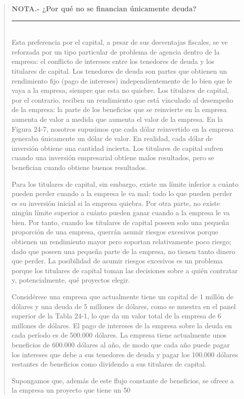 \documentclass[10pt,a4paper]{article}
\newenvironment{specialblock}[1]{%
      \begin{quote} %
      \small %
      \noindent\textbf{#1}\\[-0.3em] %
      \rule{\linewidth}{0.4pt}\\[0.6em]}{
      \end{quote}}
\begin{document}
\begin{specialblock}{\textbf{NOTA.-} ¿Por qué no se financian únicamente deuda?}
    Esta preferencia por el capital, a pesar de sus desventajas fiscales, se ve reforzada por un tipo particular de problema de agencia dentro de la empresa: el conflicto de intereses entre los tenedores de deuda y los titulares de capital. Los tenedores de deuda son partes que obtienen un rendimiento fijo (pago de intereses) independientemente de lo bien que le vaya a la empresa, siempre que esta no quiebre. Los titulares de capital, por el contrario, reciben un rendimiento que está vinculado al desempeño de la empresa: la parte de los beneficios que se reinvierte en la empresa aumenta de valor a medida que aumenta el valor de la empresa. En la Figura 24-7, nosotros  supusimos que cada dólar reinvertido en la empresa generaba únicamente un dólar de valor. En realidad, cada dólar de inversión obtiene una cantidad incierta. Los titulares de capital sufren cuando una inversión empresarial obtiene malos resultados, pero se benefician cuando obtiene buenos resultados.

    Para los titulares de capital, sin embargo, existe un límite inferior a cuánto pueden perder cuando a la empresa le va mal: todo lo que pueden perder es su inversión inicial si la empresa quiebra. Por otra parte, no existe ningún límite superior a cuánto pueden ganar cuando a la empresa le va bien. Por tanto, cuando los titulares de capital poseen solo una pequeña proporción de una empresa, querrán asumir riesgos excesivos porque obtienen un rendimiento mayor pero soportan relativamente poco riesgo; dado que poseen una pequeña parte de la empresa, no tienen tanto dinero que perder. La posibilidad de asumir riesgos excesivos es un problema porque los titulares de capital toman las decisiones sobre a quién contratar y, potencialmente, qué proyectos elegir.
    
    Considérese una empresa que actualmente tiene un capital de 1 millón de dólares y una deuda de 5 millones de dólares, como se muestra en el panel superior de la Tabla 24-1, lo que da un valor total de la empresa de 6 millones de dólares. El pago de intereses de la empresa sobre la deuda en cada período es de 500.000 dólares. La empresa tiene actualmente unos beneficios de 600.000 dólares al año, de modo que cada año puede pagar los intereses que debe a sus tenedores de deuda y pagar los 100.000 dólares restantes de beneficios como dividendo a sus titulares de capital.
    
    Supongamos que, además de este flujo constante de beneficios, se ofrece a la empresa un proyecto que tiene un 50 %
    

\end{specialblock}
\end{document}
